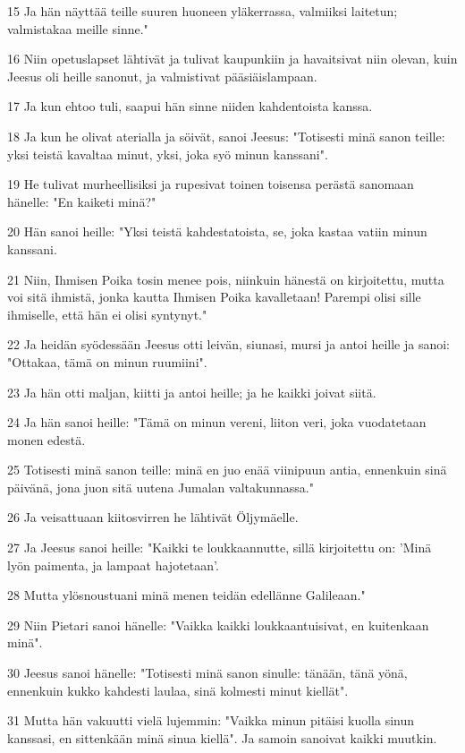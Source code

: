 \par 15 Ja hän näyttää teille suuren huoneen yläkerrassa, valmiiksi laitetun; valmistakaa meille sinne."
\par 16 Niin opetuslapset lähtivät ja tulivat kaupunkiin ja havaitsivat niin olevan, kuin Jeesus oli heille sanonut, ja valmistivat pääsiäislampaan.
\par 17 Ja kun ehtoo tuli, saapui hän sinne niiden kahdentoista kanssa.
\par 18 Ja kun he olivat aterialla ja söivät, sanoi Jeesus: "Totisesti minä sanon teille: yksi teistä kavaltaa minut, yksi, joka syö minun kanssani".
\par 19 He tulivat murheellisiksi ja rupesivat toinen toisensa perästä sanomaan hänelle: "En kaiketi minä?"
\par 20 Hän sanoi heille: "Yksi teistä kahdestatoista, se, joka kastaa vatiin minun kanssani.
\par 21 Niin, Ihmisen Poika tosin menee pois, niinkuin hänestä on kirjoitettu, mutta voi sitä ihmistä, jonka kautta Ihmisen Poika kavalletaan! Parempi olisi sille ihmiselle, että hän ei olisi syntynyt."
\par 22 Ja heidän syödessään Jeesus otti leivän, siunasi, mursi ja antoi heille ja sanoi: "Ottakaa, tämä on minun ruumiini".
\par 23 Ja hän otti maljan, kiitti ja antoi heille; ja he kaikki joivat siitä.
\par 24 Ja hän sanoi heille: "Tämä on minun vereni, liiton veri, joka vuodatetaan monen edestä.
\par 25 Totisesti minä sanon teille: minä en juo enää viinipuun antia, ennenkuin sinä päivänä, jona juon sitä uutena Jumalan valtakunnassa."
\par 26 Ja veisattuaan kiitosvirren he lähtivät Öljymäelle.
\par 27 Ja Jeesus sanoi heille: "Kaikki te loukkaannutte, sillä kirjoitettu on: 'Minä lyön paimenta, ja lampaat hajotetaan'.
\par 28 Mutta ylösnoustuani minä menen teidän edellänne Galileaan."
\par 29 Niin Pietari sanoi hänelle: "Vaikka kaikki loukkaantuisivat, en kuitenkaan minä".
\par 30 Jeesus sanoi hänelle: "Totisesti minä sanon sinulle: tänään, tänä yönä, ennenkuin kukko kahdesti laulaa, sinä kolmesti minut kiellät".
\par 31 Mutta hän vakuutti vielä lujemmin: "Vaikka minun pitäisi kuolla sinun kanssasi, en sittenkään minä sinua kiellä". Ja samoin sanoivat kaikki muutkin.
